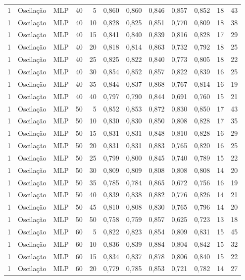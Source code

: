 \begin{longtable}{ccclrrrrrrrr}
1 & Oscilação & MLP & 40 & 5 & 0,860 & 0,860 & 0,846 & 0,857 & 0,852 & 18 & 43 \\
1 & Oscilação & MLP & 40 & 10 & 0,828 & 0,825 & 0,851 & 0,770 & 0,809 & 18 & 38 \\
1 & Oscilação & MLP & 40 & 15 & 0,841 & 0,840 & 0,839 & 0,816 & 0,828 & 17 & 29 \\
1 & Oscilação & MLP & 40 & 20 & 0,818 & 0,814 & 0,863 & 0,732 & 0,792 & 18 & 25 \\
1 & Oscilação & MLP & 40 & 25 & 0,825 & 0,822 & 0,840 & 0,773 & 0,805 & 18 & 22 \\
1 & Oscilação & MLP & 40 & 30 & 0,854 & 0,852 & 0,857 & 0,822 & 0,839 & 16 & 25 \\
1 & Oscilação & MLP & 40 & 35 & 0,844 & 0,837 & 0,868 & 0,767 & 0,814 & 16 & 19 \\
1 & Oscilação & MLP & 40 & 40 & 0,797 & 0,790 & 0,844 & 0,691 & 0,760 & 15 & 21 \\
1 & Oscilação & MLP & 50 & 5 & 0,852 & 0,853 & 0,872 & 0,830 & 0,850 & 17 & 43 \\
1 & Oscilação & MLP & 50 & 10 & 0,830 & 0,830 & 0,850 & 0,808 & 0,828 & 17 & 35 \\
1 & Oscilação & MLP & 50 & 15 & 0,831 & 0,831 & 0,848 & 0,810 & 0,828 & 16 & 29 \\
1 & Oscilação & MLP & 50 & 20 & 0,831 & 0,831 & 0,883 & 0,765 & 0,820 & 16 & 25 \\
1 & Oscilação & MLP & 50 & 25 & 0,799 & 0,800 & 0,845 & 0,740 & 0,789 & 15 & 22 \\
1 & Oscilação & MLP & 50 & 30 & 0,809 & 0,809 & 0,808 & 0,808 & 0,808 & 14 & 20 \\
1 & Oscilação & MLP & 50 & 35 & 0,785 & 0,784 & 0,865 & 0,672 & 0,756 & 16 & 19 \\
1 & Oscilação & MLP & 50 & 40 & 0,839 & 0,838 & 0,882 & 0,776 & 0,826 & 14 & 21 \\
1 & Oscilação & MLP & 50 & 45 & 0,810 & 0,808 & 0,830 & 0,765 & 0,796 & 14 & 20 \\
1 & Oscilação & MLP & 50 & 50 & 0,758 & 0,759 & 0,857 & 0,625 & 0,723 & 13 & 18 \\
1 & Oscilação & MLP & 60 & 5 & 0,822 & 0,823 & 0,854 & 0,809 & 0,831 & 15 & 45 \\
1 & Oscilação & MLP & 60 & 10 & 0,836 & 0,839 & 0,884 & 0,804 & 0,842 & 15 & 32 \\
1 & Oscilação & MLP & 60 & 15 & 0,834 & 0,837 & 0,878 & 0,806 & 0,840 & 15 & 22 \\
1 & Oscilação & MLP & 60 & 20 & 0,779 & 0,785 & 0,853 & 0,721 & 0,782 & 14 & 27 \\

\end{longtable}
